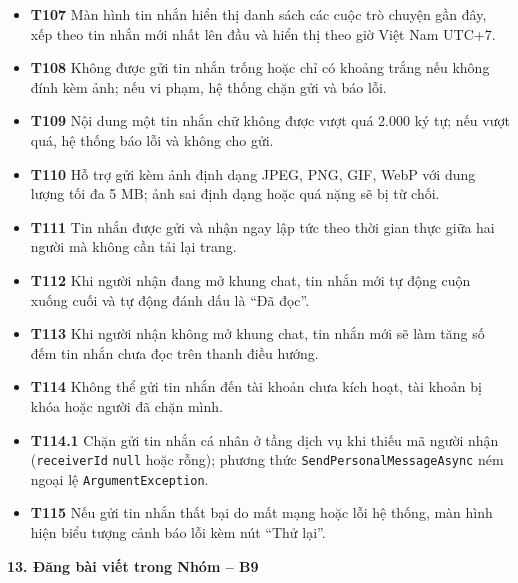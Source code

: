 \documentclass[11pt,a4paper]{article}
\begin{document}
\begin{itemize}[leftmargin=0.9cm, label=$\bullet$, itemsep=2pt, topsep=4pt]
    \item \textbf{T107} Màn hình tin nhắn hiển thị danh sách các cuộc trò chuyện gần đây, xếp theo tin nhắn mới nhất lên đầu và hiển thị theo giờ Việt Nam UTC+7.
    \item \textbf{T108} Không được gửi tin nhắn trống hoặc chỉ có khoảng trắng nếu không đính kèm ảnh; nếu vi phạm, hệ thống chặn gửi và báo lỗi.
    \item \textbf{T109} Nội dung một tin nhắn chữ không được vượt quá 2.000 ký tự; nếu vượt quá, hệ thống báo lỗi và không cho gửi.
    \item \textbf{T110} Hỗ trợ gửi kèm ảnh định dạng JPEG, PNG, GIF, WebP với dung lượng tối đa 5 MB; ảnh sai định dạng hoặc quá nặng sẽ bị từ chối.
    \item \textbf{T111} Tin nhắn được gửi và nhận ngay lập tức theo thời gian thực giữa hai người mà không cần tải lại trang.
    \item \textbf{T112} Khi người nhận đang mở khung chat, tin nhắn mới tự động cuộn xuống cuối và tự động đánh dấu là ``Đã đọc''.
    \item \textbf{T113} Khi người nhận không mở khung chat, tin nhắn mới sẽ làm tăng số đếm tin nhắn chưa đọc trên thanh điều hướng.
    \item \textbf{T114} Không thể gửi tin nhắn đến tài khoản chưa kích hoạt, tài khoản bị khóa hoặc người đã chặn mình.
    \item \textbf{T114.1} Chặn gửi tin nhắn cá nhân ở tầng dịch vụ khi thiếu mã người nhận (\texttt{receiverId} \texttt{null} hoặc rỗng); phương thức \texttt{SendPersonalMessageAsync} ném ngoại lệ \texttt{ArgumentException}.
    \item \textbf{T115} Nếu gửi tin nhắn thất bại do mất mạng hoặc lỗi hệ thống, màn hình hiện biểu tượng cảnh báo lỗi kèm nút ``Thử lại''.
\end{itemize}
\smallskip
\noindent\textbf{13. Đăng bài viết trong Nhóm -- B9}
\end{document}

